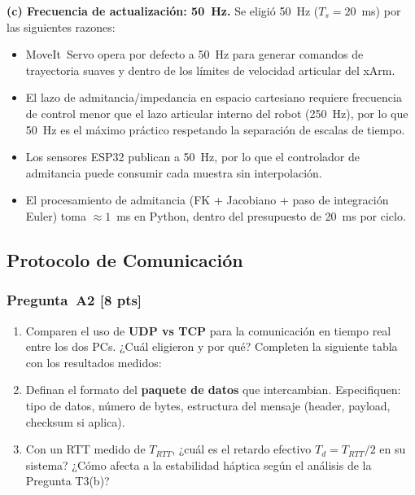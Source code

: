 \documentclass[journal,10pt,twoside]{IEEEtran}
\newcommand{\pts}[1]{\textcolor{tec_red}{\textbf{[#1 pts]}}}
\begin{document}
\textbf{(c) Frecuencia de actualización: 50~Hz.}
Se eligió 50~Hz ($T_s = 20$~ms) por las siguientes razones:
\begin{itemize}
  \item MoveIt~Servo opera por defecto a 50~Hz para generar comandos
        de trayectoria suaves y dentro de los límites de velocidad
        articular del xArm.
  \item El lazo de admitancia/impedancia en espacio cartesiano requiere
        frecuencia de control menor que el lazo articular interno del
        robot (250~Hz), por lo que 50~Hz es el máximo práctico
        respetando la separación de escalas de tiempo.
  \item Los sensores ESP32 publican a 50~Hz, por lo que el controlador
        de admitancia puede consumir cada muestra sin interpolación.
  \item El procesamiento de admitancia (FK + Jacobiano + paso de
        integración Euler) toma $\approx 1$~ms en Python, dentro del
        presupuesto de 20~ms por ciclo.
\end{itemize}

\subsection{Protocolo de Comunicación}

\subsubsection*{Pregunta~A2 \pts{8}}
\begin{enumerate}[label=(\alph*)]
  \item Comparen el uso de \textbf{UDP vs TCP} para la comunicación
        en tiempo real entre los dos PCs. ¿Cuál eligieron y por qué?
        Completen la siguiente tabla con los resultados medidos:

        \smallskip
        \smallskip

  \item Definan el formato del \textbf{paquete de datos} que intercambian.
        Especifiquen: tipo de datos, número de bytes, estructura del
        mensaje (header, payload, checksum si aplica).
  \item Con un RTT medido de $T_{RTT}$, ¿cuál es el retardo efectivo
        $T_d = T_{RTT}/2$ en su sistema? ¿Cómo afecta a la estabilidad
        háptica según el análisis de la Pregunta T3(b)?
\end{enumerate}
\end{document}
